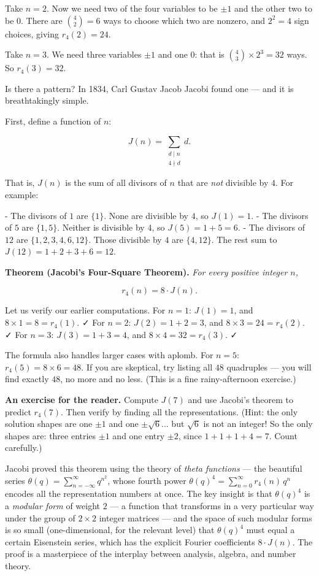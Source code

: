Take $n = 2$. Now we need two of the four variables to be $\pm 1$ and the other two to be $0$. There are $\binom{4}{2} = 6$ ways to choose which two are nonzero, and $2^2 = 4$ sign choices, giving $r_4(2) = 24$.

Take $n = 3$. We need three variables $\pm 1$ and one $0$: that is $\binom{4}{3} \times 2^3 = 32$ ways. So $r_4(3) = 32$.

Is there a pattern? In 1834, Carl Gustav Jacob Jacobi found one --- and it is breathtakingly simple.

First, define a function of $n$:

\[J(n) = \sum_{\substack{d \mid n \\ 4 \nmid d}} d.\]

That is, $J(n)$ is the sum of all divisors of $n$ that are \textit{not} divisible by $4$. For example:

- The divisors of $1$ are $\{1\}$. None are divisible by $4$, so $J(1) = 1$.
- The divisors of $5$ are $\{1, 5\}$. Neither is divisible by $4$, so $J(5) = 1 + 5 = 6$.
- The divisors of $12$ are $\{1, 2, 3, 4, 6, 12\}$. Those divisible by $4$ are $\{4, 12\}$. The rest sum to $J(12) = 1 + 2 + 3 + 6 = 12$.

\textbf{Theorem (Jacobi's Four-Square Theorem).} \textit{For every positive integer $n$,}

\[r_4(n) = 8 \cdot J(n).\]


Let us verify our earlier computations. For $n = 1$: $J(1) = 1$, and $8 \times 1 = 8 = r_4(1)$. ✓ For $n = 2$: $J(2) = 1 + 2 = 3$, and $8 \times 3 = 24 = r_4(2)$. ✓ For $n = 3$: $J(3) = 1 + 3 = 4$, and $8 \times 4 = 32 = r_4(3)$. ✓

The formula also handles larger cases with aplomb. For $n = 5$: $r_4(5) = 8 \times 6 = 48$. If you are skeptical, try listing all $48$ quadruples --- you will find exactly $48$, no more and no less. (This is a fine rainy-afternoon exercise.)


\textbf{An exercise for the reader.} Compute $J(7)$ and use Jacobi's theorem to predict $r_4(7)$. Then verify by finding all the representations. (Hint: the only solution shapes are one $\pm 1$ and one $\pm\sqrt{6}$... but $\sqrt{6}$ is not an integer! So the only shapes are: three entries $\pm 1$ and one entry $\pm 2$, since $1 + 1 + 1 + 4 = 7$. Count carefully.)

Jacobi proved this theorem using the theory of \textit{theta functions} --- the beautiful series $\theta(q) = \sum_{n=-\infty}^{\infty} q^{n^2}$, whose fourth power $\theta(q)^4 = \sum_{n=0}^{\infty} r_4(n)\, q^n$ encodes all the representation numbers at once. The key insight is that $\theta(q)^4$ is a \textit{modular form} of weight $2$ --- a function that transforms in a very particular way under the group of $2 \times 2$ integer matrices --- and the space of such modular forms is so small (one-dimensional, for the relevant level) that $\theta(q)^4$ must equal a certain Eisenstein series, which has the explicit Fourier coefficients $8 \cdot J(n)$. The proof is a masterpiece of the interplay between analysis, algebra, and number theory.


